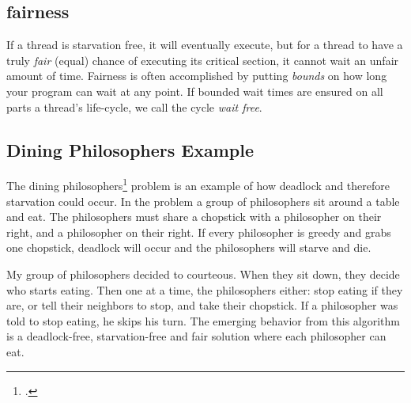 \documentclass[titlepage]{article}
\begin{document}
\subsection{fairness}

If a thread is starvation free, it will eventually execute, but for a thread to have a truly \textit{fair} (equal) chance of executing its critical section, it cannot wait an unfair amount of time. Fairness is often accomplished by putting \textit{bounds} on how long your program can wait at any point. If bounded wait times are ensured on all parts a thread's life-cycle, we call the cycle \textit{wait free}.

\subsection{Dining Philosophers Example}

The dining philosophers\footcite[original notes on concurrency from dijkstra]{Dijkstra:1965:CSP:1102034} problem is an example of how deadlock and therefore starvation could occur. In the problem a group of philosophers sit around a table and eat. The philosophers must share a chopstick with a philosopher on their right, and a philosopher on their right. If every philosopher is greedy and grabs one chopstick, deadlock will occur and the philosophers will starve and die.

My group of philosophers decided to courteous. When they sit down, they decide who starts eating. Then one at a time, the philosophers either: stop eating if they are, or tell their neighbors to stop, and take their chopstick. If a philosopher was told to stop eating, he skips his turn. The emerging behavior from this algorithm is a deadlock-free, starvation-free and fair solution where each philosopher can eat.

\iffalse
\begin{itemize}
    \item readers-writers problem (requires waiting)
    \item producer consumer (1--1) (interrupts) vs consumer consumer (M--M)(roles) (the philosophers are both)
    \item readers-writers problem (requires waiting)
\end{itemize}
\fi
\end{document}
